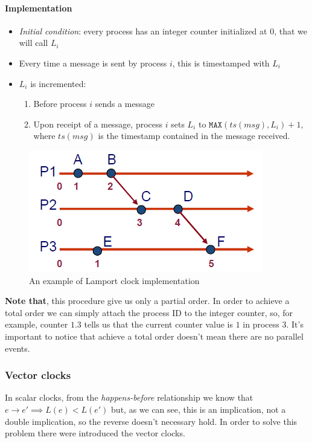 \paragraph{Implementation}
\begin{itemize}
    \item \textit{Initial condition}: every process has an integer counter initialized at 0, that we will call $L_i$
    \item Every time a message is sent by process $i$, this is timestamped with $L_i$
    \item $L_i$ is incremented:
    \begin{enumerate}
        \item Before process $i$ sends a message
        \item Upon receipt of a message, process $i$ sets $L_i$ to $\texttt{MAX}(ts(msg), L_i) + 1$, where $ts(msg)$ is the timestamp contained in the message received.
    \end{enumerate}
\end{itemize}

\begin{figure}[h]
    \caption{An example of Lamport clock implementation}
    \includegraphics[scale=0.5]{src/images/synchronization/scalar-clock.png}
    \centering
\end{figure}

\textbf{Note that}, this procedure give us only a partial order. In order to achieve a total order we can simply attach the process ID to the integer counter, so, for example, counter $1.3$ tells us that the current counter value is $1$ in process $3$. It's important to notice that achieve a total order doesn't mean there are no parallel events.

\subsubsection{Vector clocks}
In scalar clocks, from the \textit{happens-before} relationship we know that $e \rightarrow e' \implies L(e) < L(e')$ but, as we can see, this is an implication, not a double implication, so the reverse doesn't necessary hold. In order to solve this problem there were introduced the vector clocks.

